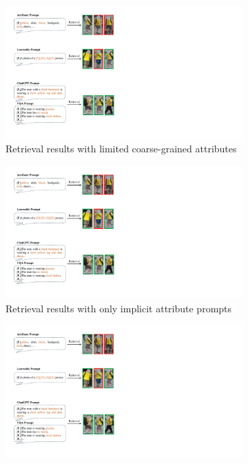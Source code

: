 \documentclass[letterpaper]{article} %
\begin{document}
\begin{figure}[t!]
  \centering
  \begin{subfigure}[t]{1\columnwidth}
		\centering
		\includegraphics[width=0.99\linewidth]{example_a.pdf}
		\caption{Retrieval results with limited coarse-grained attributes}
    \label{subfig:example_a}
  \end{subfigure}
  \begin{subfigure}[t]{1\columnwidth}
		\centering
		\includegraphics[width=0.99\linewidth]{example_b.pdf}
        \caption{Retrieval results with only implicit attribute prompts}
    \label{subfig:example_b}
  \end{subfigure}
  \begin{subfigure}[t]{1\columnwidth}
		\centering
		\includegraphics[width=0.99\linewidth]{example_c.pdf}

\end{subfigure}
\end{figure}
\end{document}
